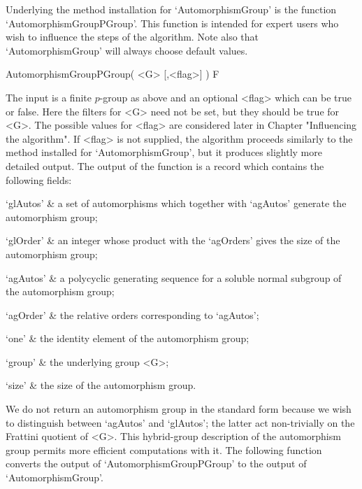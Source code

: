 

Underlying the method installation for `AutomorphismGroup'
is the function `AutomorphismGroupPGroup'. This function is
intended for expert users who wish to influence the steps of 
the algorithm.  Note also that `AutomorphismGroup' will always
choose default values.

\> AutomorphismGroupPGroup( <G> [,<flag>] )  F

The input is a finite $p$-group as above and an optional <flag> 
which can be true or false. Here the filters for <G> need not be 
set, but they should be true for <G>. The possible values for <flag>
are considered later in Chapter "Influencing the algorithm". If 
<flag> is not supplied, the algorithm proceeds similarly to the 
method installed for `AutomorphismGroup', but it produces slightly 
more detailed output.  The output of the function is a record 
which contains the following fields:

\beginitems
`glAutos' & a set of automorphisms which together with `agAutos'
            generate the automorphism group;

`glOrder' & an integer whose product with the `agOrders' gives
            the size of the automorphism group;

`agAutos' & a polycyclic generating sequence for a soluble normal
            subgroup of the automorphism group;

`agOrder' & the relative orders corresponding to `agAutos';

`one'     & the identity element of the automorphism group;

`group'   & the underlying group <G>;

`size'    & the size of the automorphism group.
\enditems

We do not return an automorphism group in the standard form 
because we wish to distinguish between `agAutos' and `glAutos'; 
the latter act non-trivially on the Frattini quotient of <G>. This
hybrid-group description of the automorphism group permits more 
efficient computations with it. The following function converts
the output of `AutomorphismGroupPGroup' to the output of 
`AutomorphismGroup'.

